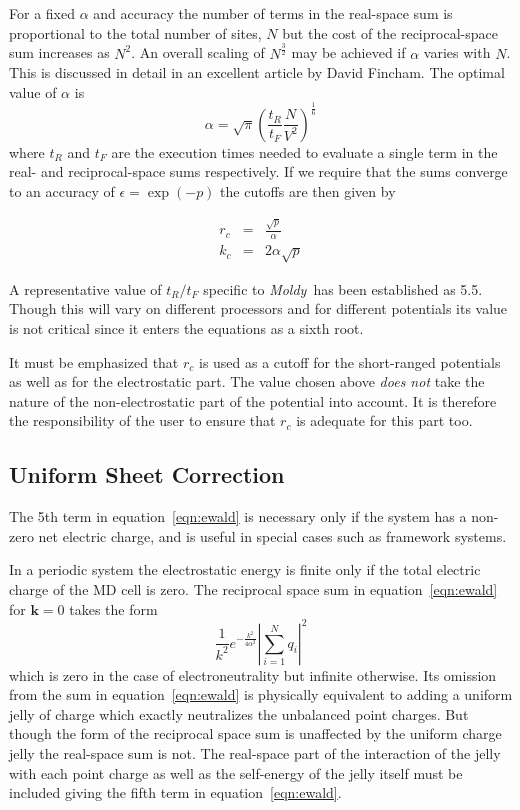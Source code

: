 \documentclass[a4paper,twoside]{report}
\providecommand{\bm}[1]{\mathbf{#1}}
\newcommand{\moldy}{\emph{Moldy}}
\begin{document}
For a fixed $\alpha$ and accuracy the number of terms in the
real-space sum is proportional to the total number of sites, $N$ but
the cost of the reciprocal-space sum increases as $N^2$. An overall
scaling of $N^\frac{3}{2}$ may be achieved if $\alpha$ varies with
$N$. This is discussed in detail in an excellent article by David
Fincham\cite{fincham:94}.  The optimal value of $\alpha$ is
%
\begin{equation}
\alpha = \sqrt{\pi} \left ( \frac{t_R}{t_F} \frac{N}{V^2}\right )
^\frac{1}{6} 
\label{eqn:ewald-alpha}
\end{equation}
%
where $t_R$ and $t_F$ are the execution times needed to evaluate a
single term in the real- and reciprocal-space sums respectively.
If we require that the sums converge to an accuracy of $ \epsilon =
\exp ( -p )$ the cutoffs are then given by

\begin{eqnarray}
r_c  &=& \frac{\sqrt{p}}{\alpha} \\
k_c &=& 2 \alpha \sqrt{p}
\label{eqn:ewald-cut}
\end{eqnarray}

A representative value of $t_R/t_F$ specific to \moldy\ has been
established as 5.5.  Though this will vary on different processors
and for different potentials its value is not critical since it
enters the equations as a sixth root.  

It must be emphasized that $r_c$ is used as a cutoff for the
short-ranged potentials as well as for the electrostatic part.  The
value chosen above \emph{does not} take the nature of the
non-electrostatic part of the potential into account.  It is therefore
the responsibility of the user to ensure that $r_c$ is adequate for
this part too.

\subsection{Uniform Sheet Correction}
The 5th term in equation~\ref{eqn:ewald} is necessary only if the system
has a non-zero net electric charge, and is useful in special cases such
as framework systems.  

In a periodic system the electrostatic energy is finite only if the
total electric charge of the MD cell is zero.  The reciprocal space
sum in equation~\ref{eqn:ewald} for $\bm{k}=0$ takes the form
\[\frac{1}{k^2}e^{-\frac{k^2}{4 \alpha^2}} \left | \sum_{i=1}^{N} q_i
 \right |^2\] which is zero in the case of electroneutrality but
infinite otherwise.  Its omission from the sum in
equation~\ref{eqn:ewald} is physically equivalent to adding a uniform
jelly of charge which exactly neutralizes the unbalanced point
charges.  But though the form of the reciprocal space sum is
unaffected by the uniform charge jelly the real-space sum is not.  The
real-space part of the interaction of the jelly with each point charge
as well as the self-energy of the jelly itself must be included giving
the fifth term in equation~\ref{eqn:ewald}.
\end{document}
